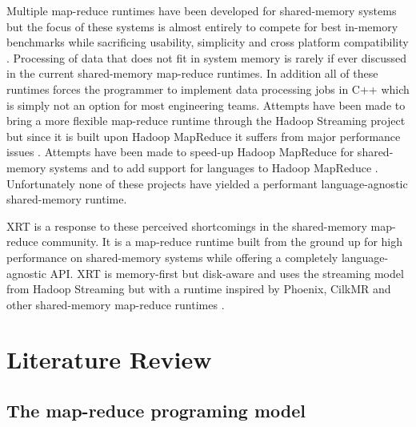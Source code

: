 \documentclass[11pt]{article}       %
\begin{document}

Multiple map-reduce runtimes have been developed for shared-memory systems but
the focus of these systems is almost entirely to compete for best in-memory
benchmarks while sacrificing usability, simplicity and cross platform
compatibility \cite{Phoenix} \cite{CilkMR} \cite{TODO...}. Processing of data
that does not fit in system memory is rarely if ever discussed in the current
shared-memory map-reduce runtimes. In addition all of these runtimes forces the
programmer to implement data processing jobs in C++ which is simply not an
option for most engineering teams. Attempts have been made to bring a more
flexible map-reduce runtime through the Hadoop Streaming project
\cite{HadoopStreaming} but since it is built upon Hadoop MapReduce it suffers
from major performance issues \cite{...}. Attempts have been made to speed-up
Hadoop MapReduce for shared-memory systems \cite{...} and to add support for
languages to Hadoop MapReduce \cite{...} \cite{...} \cite{...}. Unfortunately
none of these projects have yielded a performant language-agnostic shared-memory
runtime.


XRT is a response to these perceived shortcomings in the shared-memory
map-reduce community. It is a map-reduce runtime built from the ground up for
high performance on shared-memory systems while offering a completely
language-agnostic API. XRT is memory-first but disk-aware and uses the streaming
model from Hadoop Streaming \cite{} but with a runtime inspired by Phoenix,
CilkMR and other shared-memory map-reduce runtimes \cite{} \cite{}.

\section{Literature Review} \label{litrev}

\subsection{The map-reduce programing model}
\end{document}
